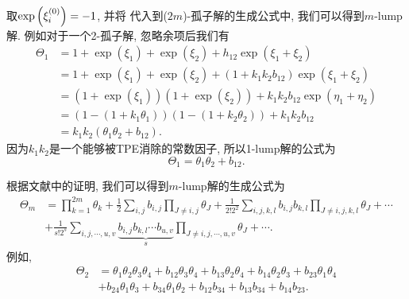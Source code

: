取$\exp\left(\xi_i^{(0)}\right)=-1$, 并将 代入到($2m$)-孤子解的生成公式中, 我们可以得到$m$-lump解. 例如对于一个2-孤子解, 忽略余项后我们有
\begin{equation}
\begin{split}
\Theta_1&=1+\exp(\xi_1)+\exp(\xi_2)+h_{12}\exp(\xi_1+\xi_2) \\ 
&= 1+\exp(\xi_1)+\exp(\xi_2)+(1+k_1k_2b_{12})\exp(\xi_1+\xi_2) \\ 
&=(1+\exp(\xi_1))(1+\exp(\xi_2))+k_1k_2b_{12}\exp(\eta_1+\eta_2) \\ 
&=(1-(1+k_1\theta_1))(1-(1+k_2\theta_2))+k_1k_2b_{12} \\
&=k_1k_2(\theta_1\theta_2+b_{12}).
\end{split}
\end{equation}
因为$k_1k_2$是一个能够被TPE消除的常数因子, 所以1-lump解的公式为
\begin{equation}
    \Theta_1=\theta_1\theta_2+b_{12}.
\end{equation}

根据文献\cite{satsuma1979two}中的证明, 我们可以得到$m$-lump解的生成公式为
\begin{equation}
\begin{split}
    \Theta_m&=\prod_{k=1}^{2m}\theta_k+\frac{1}{2}\sum_{i,j}{b_{i,j}}\prod_{J\neq i,j}{\theta_J}+\frac{1}{2! 2^2}\sum_{i,j,k,l}{b_{i,j}b_{k,l}}\prod_{J\neq i,j,k,l}{\theta_{J}}+\cdots \\
    &+\frac{1}{s!2^s}\sum_{i,j,\cdots,u,v}\underbrace{{b_{i,j}b_{k,l}\cdots b_{u,v}}}_{s}\prod_{J\neq i,j,\cdots, u,v}{\theta_J}+\cdots. \label{f-lump-old}
\end{split}
\end{equation}
例如, 
\begin{equation}
\renewcommand{\t}[1]{\theta_{#1}}
\renewcommand{\b}[1]{b_{#1}}
\begin{split}
\Theta_2&=\t{1}\t{2}\t{3}\t{4}+\b{12}\t{3}\t{4}+\b{13}\t{2}\t{4}+\b{14}\t{2}\t{3}+\b{23}\t{1}\t{4}\\
&+\b{24}\t{1}\t{3}+\b{34}\t{1}\t{2}+\b{12}\b{34}+\b{13}\b{34}+\b{14}\b{23}.
\end{split}
\end{equation}

